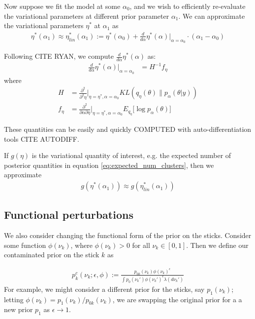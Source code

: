 \documentclass[a4paper]{article}
\begin{document}
Now suppose we fit the model at some $\alpha_0$, and we wish to efficiently
re-evaluate the variational parameters at different prior parameter $\alpha_1$.
We can approximate the variational parameters $\eta^*$ at $\alpha_1$ as
\begin{align}
    \eta^*(\alpha_1) \approx \eta^*_{lin}(\alpha_1)
    := \eta^*(\alpha_0) + \frac{d}{d\alpha}\eta^*(\alpha)\Big|_{\alpha=\alpha_0} \cdot (\alpha_1 - \alpha_0)
    \label{eq:our_approximation}
\end{align}

Following CITE RYAN,  we compute $\frac{d}{d\alpha}\eta^*(\alpha) $ as:
\begin{align}
  \frac{d}{d\alpha}\eta^*(\alpha)\Big|_{\alpha=\alpha_0} &= H^{-1} f_\eta \label{eq:vb_sensitivty}
\end{align}
where
\begin{align}
  H &= \frac{\partial^2}{\partial^2\eta}\Big\rvert_{\eta = \eta^*, \alpha = \alpha_0}
  KL(q_\eta\left(\theta\right) \| p_\alpha(\theta | y)) \\
  f_\eta &= \frac{\partial^2}{\partial \alpha \partial \eta}\Big\rvert_{\eta = \eta^*, \alpha = \alpha_0} E_{q_{\eta}} \big[\log p_\alpha(\theta)\big]
\end{align}

These quantities can be easily and quickly COMPUTED with auto-differentiation tools CITE AUTODIFF.

If $g(\eta)$ is the variational quantity of interest,
e.g. the expected number of posterior quantities in equation \ref{eq:expected_num_clusters},
then we approximate
\begin{align}
    g(\eta^*(\alpha_1)) \approx g(\eta^*_{lin}(\alpha_1))
\end{align}

\subsection{Functional perturbations}
\label{sec:func_pert}
We also consider changing the functional form of the prior on the sticks.
Consider some function $\phi(\nu_k)$, where $\phi(\nu_k) > 0$ for all $\nu_k \in [0, 1]$.
Then we define our contaminated prior on the stick $k$ as

\begin{align}
	\label{eq:expon_perturb}
	p^c_{k}(\nu_k ; \epsilon, \phi) :=
  \frac{p_{0k}(\nu_k)\phi(\nu_k)^\epsilon}{\int p_0(\nu_k')\phi(\nu_k')^\epsilon \lambda(d\nu_k')}
\end{align}
For example, we might consider a different prior for the sticks, say $p_1(\nu_k)$;
letting $\phi(\nu_k) = p_1(\nu_k) / p_{0k}(\nu_k)$,
we are swapping the original prior for a a new prior $p_1$ as $\epsilon \rightarrow 1$.
\end{document}
